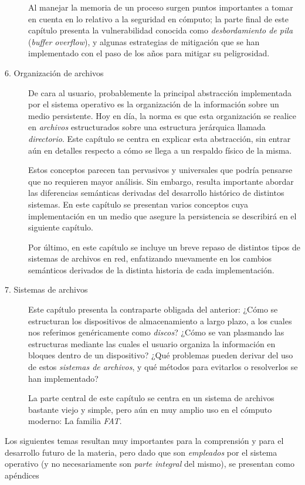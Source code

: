 \documentclass[11pt,fleqn]{book} %
\begin{document}
\begin{description}
     Al manejar la memoria de un proceso surgen puntos importantes a
     tomar en cuenta en lo relativo a la seguridad en cómputo; la
     parte final de este capítulo presenta la vulnerabilidad conocida
     como \emph{desbordamiento de pila} (\emph{buffer overflow}), y algunas
     estrategias de mitigación que se han implementado con el paso de
     los años para mitigar su peligrosidad.
\item[6. Organización de archivos] De cara al usuario, probablemente la
     principal abstracción implementada por el sistema operativo es la
     organización de la información sobre un medio persistente. Hoy en
     día, la norma es que esta organización se realice en \emph{archivos}
     estructurados sobre una estructura jerárquica llamada
     \emph{directorio}. Este capítulo se centra en explicar esta
     abstracción, sin entrar aún en detalles respecto a cómo se llega
     a un respaldo físico de la misma.

     Estos conceptos parecen tan pervasivos y universales que podría
     pensarse que no requieren mayor análisis. Sin embargo, resulta
     importante abordar las diferencias semánticas derivadas del
     desarrollo histórico de distintos sistemas. En este capítulo se
     presentan varios conceptos cuya implementación en un medio que
     asegure la persistencia se describirá en el siguiente capítulo.

     Por último, en este capítulo se incluye un breve repaso de
     distintos tipos de sistemas de archivos en red, enfatizando
     nuevamente en los cambios semánticos derivados de la distinta
     historia de cada implementación.
\item[7. Sistemas de archivos] Este capítulo presenta la contraparte
     obligada del anterior: ¿Cómo se estructuran los dispositivos de
     almacenamiento a largo plazo, a los cuales nos referimos
     genéricamente como \emph{discos}? ¿Cómo se van plasmando las
     estructuras mediante las cuales el usuario organiza la
     información en bloques dentro de un dispositivo? ¿Qué problemas
     pueden derivar del uso de estos \emph{sistemas de archivos}, y qué
     métodos para evitarlos o resolverlos se han implementado?

     La parte central de este capítulo se centra en un sistema de
     archivos bastante viejo y simple, pero aún en muy amplio uso en el cómputo
     moderno: La familia \emph{FAT}.
\end{description}

Los siguientes temas resultan muy importantes para la comprensión y
para el desarrollo futuro de la materia, pero dado que son \emph{empleados}
por el sistema operativo (y no necesariamente son \emph{parte integral} del
mismo), se presentan como apéndices
\end{document}
